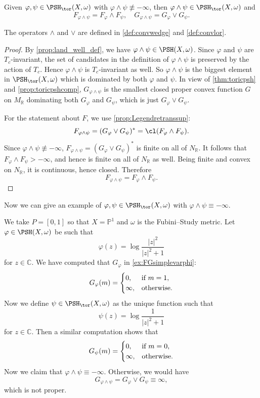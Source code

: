 \begin{proposition}\label{prop:toricrooftop}
    Given $\varphi,\psi\in \PSH_{\tor}(X,\omega)$ with $\varphi\land \psi\not\equiv -\infty$, then $\varphi\land \psi\in \PSH_{\tor}(X,\omega)$ and
    \[
    F_{\varphi\land \psi}=F_{\varphi}\land F_{\psi},\quad G_{\varphi\land \psi}=G_{\varphi}\lor G_{\psi}.
    \]
\end{proposition}
The operators $\land$ and $\lor$ are defined in \cref{def:convwedge} and \cref{def:convlor}.
\begin{proof}
By \cref{prop:land_well_def}, we have $\varphi\land \psi\in \PSH(X,\omega)$. Since $\varphi$ and $\psi$ are $T_c$-invariant, the set of candidates in the definition of $\varphi\land\psi$ is preserved by the action of $T_c$. Hence $\varphi\land\psi$ is $T_c$-invariant as well.
So $\varphi\land \psi$ is the biggest element in $\PSH_{\tor}(X,\omega)$ which is dominated by both $\varphi$ and $\psi$. In view of \cref{thm:toricpsh} and \cref{prop:toricpshcomp}, $G_{\varphi\land \psi}$ is the smallest closed proper convex function $G$ on $M_{\mathbb{R}}$ dominating both $G_{\varphi}$ and $G_{\psi}$, which is just $G_{\varphi}\lor G_{\psi}$.

For the statement about $F$, we use \cref{prop:Legendretranssup}:
\[
    F_{\varphi\land\psi}=(G_\varphi\lor G_\psi)^*=\cl(F_\varphi\land F_\psi).
\]
Since $\varphi\land\psi\not\equiv-\infty$, $F_{\varphi\land\psi}=(G_\varphi\lor G_\psi)^*$ is finite on all of $N_{\mathbb R}$. It follows that $F_\varphi\land F_\psi>-\infty$, and hence is finite on all of $N_{\mathbb R}$ as well. Being finite and convex on $N_{\mathbb R}$, it is continuous, hence closed. Therefore
\[
    F_{\varphi\land\psi}=F_\varphi\land F_\psi.
\]
\end{proof}

\begin{example}\label{ex:landminfty}
    Now we can give an example of $\varphi,\psi\in \PSH_{\tor}(X,\omega)$ with $\varphi\land \psi\equiv -\infty$.

    We take $P=[0,1]$ so that $X=\mathbb{P}^1$ and $\omega$ is the Fubini--Study metric. Let $\varphi\in \PSH(X,\omega)$ be such that
    \[
    \varphi(z)=\log \frac{|z|^2}{|z|^2+1}
    \]
    for $z\in \mathbb{C}$. We have computed that $G_{\varphi}$ in \cref{ex:FGsimplevarphi}:
    \[
    G_{\varphi}(m)=
    \begin{cases}
        0,&\textup{if } m=1,\\
        \infty,&\textup{otherwise}.
    \end{cases}
    \]
    Now we define $\psi\in \PSH_{\tor}(X,\omega)$ as the unique function such that
    \[
    \psi(z)=\log \frac{1}{|z|^2+1}
    \]
    for $z\in \mathbb{C}$. Then a similar computation shows that
    \[
    G_{\psi}(m)=
    \begin{cases}
        0,&\textup{if } m=0,\\
        \infty,&\textup{otherwise}.
    \end{cases}
    \]
    Now we claim that $\varphi\land \psi\equiv -\infty$. Otherwise, we would have
    \[
    G_{\varphi\land \psi}=G_{\varphi}\lor G_{\psi}\equiv\infty,
    \]
    which is not proper.
\end{example}

